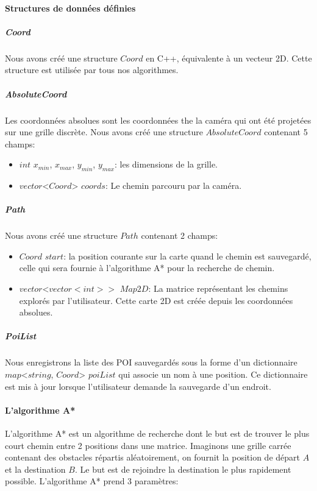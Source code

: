 \documentclass[11pt]{article}
\begin{document}
        \pagebreak

        \paragraph{Structures de données définies}

          \subparagraph{Coord}
            Nous avons créé une structure $Coord$ en C++, équivalente à un vecteur 2D. Cette structure est utilisée par tous nos algorithmes.
            
          \subparagraph{AbsoluteCoord}
            Les coordonnées absolues sont les coordonnées the la caméra qui ont été projetées sur une grille discrète. Nous avons créé une 
            structure $AbsoluteCoord$ contenant 5 champs:

            \begin{itemize}
              \item $int$ $x_{min}$, $x_{max}$, $y_{min}$, $y_{max}$: les dimensions de la grille.
              \item $vector$<$Coord$> $coords$: Le chemin parcouru par la caméra.          
            \end{itemize}    

          \subparagraph{Path}        
            Nous avons créé une structure $Path$ contenant 2 champs: 
            \begin{itemize}
              \item $Coord$ $start$: la position courante sur la carte quand le chemin est sauvegardé, celle qui sera fournie à l'algorithme
              A* pour la recherche de chemin.
              \item $vector$<$vector<int>>$ $Map2D$: La matrice représentant les chemins explorés par l'utilisateur. Cette carte 2D est créée 
              depuis les coordonnées absolues.     
            \end{itemize} 

          \subparagraph{PoiList}   
            Nous enregistrons la liste des POI sauvegardés sous la forme d'un dictionnaire $map$<$string$, $Coord$> $poiList$ qui associe
            un nom à une position. Ce dictionnaire est mis à jour lorsque l'utilisateur demande la sauvegarde d'un endroit.            

        \paragraph{L'algorithme A*}
          L'algorithme A* est un algorithme de recherche dont le but est de trouver le plus court chemin entre 2 positions dans une matrice.
          Imaginons une grille carrée contenant des obstacles répartis aléatoirement, on fournit la position de départ $A$ et la destination $B$.
          Le but est de rejoindre la destination le plus rapidement possible.
          L'algorithme A* prend 3 paramètres:
\end{document}
